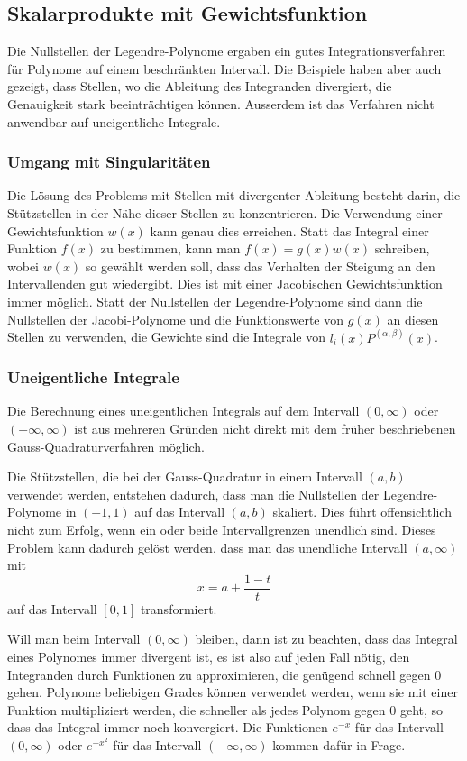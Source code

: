 \subsection{Skalarprodukte mit Gewichtsfunktion}
Die Nullstellen der Legendre-Polynome ergaben ein gutes
Integrationsverfahren für Polynome auf einem beschränkten
Intervall.
Die Beispiele haben aber auch gezeigt, dass Stellen, wo die
Ableitung des Integranden divergiert, die Genauigkeit stark
beeinträchtigen können.
Ausserdem ist das Verfahren nicht anwendbar auf uneigentliche
Integrale.

\subsubsection{Umgang mit Singularitäten}
Die Lösung des Problems mit Stellen mit divergenter Ableitung
besteht darin, die Stützstellen in der Nähe dieser Stellen
zu konzentrieren.
Die Verwendung einer Gewichtsfunktion $w(x)$ kann genau dies
erreichen.
Statt das Integral einer Funktion $f(x)$ zu bestimmen, 
kann man $f(x)=g(x)w(x)$ schreiben, wobei $w(x)$ so
gewählt werden soll, dass das Verhalten der Steigung an
den Intervallenden gut wiedergibt.
Dies ist mit einer Jacobischen Gewichtsfunktion immer möglich.
Statt der Nullstellen der Legendre-Polynome sind dann die
Nullstellen der Jacobi-Polynome  und die Funktionswerte von $g(x)$
an diesen Stellen zu verwenden,  die Gewichte sind
die Integrale von $l_i(x) P^{(\alpha,\beta)}(x)$.

\subsubsection{Uneigentliche Integrale}
Die Berechnung eines uneigentlichen Integrals auf dem Intervall
$(0,\infty)$ oder $(-\infty,\infty)$ ist aus mehreren Gründen nicht
direkt mit dem früher beschriebenen Gauss-Quadraturverfahren
möglich.

Die Stützstellen, die bei der Gauss-Quadratur in einem Intervall
$(a,b)$ verwendet werden, entstehen dadurch, dass man die Nullstellen
der Legendre-Polynome in $(-1,1)$ auf das Intervall $(a,b)$
skaliert.
Dies führt offensichtlich nicht zum Erfolg, wenn ein oder beide
Intervallgrenzen unendlich sind.
Dieses Problem kann dadurch gelöst werden, dass man das unendliche
Intervall $(a,\infty)$ mit
\[
x =  a + \frac{1-t}{t}
\]
auf das Intervall $[0,1]$ transformiert.

Will man beim Intervall $(0,\infty)$ bleiben, dann ist zu beachten,
dass das Integral eines Polynomes immer divergent ist, es ist also
auf jeden Fall nötig, den Integranden durch Funktionen zu approximieren,
die genügend schnell gegen $0$ gehen.
Polynome beliebigen Grades können verwendet werden, wenn sie mit
einer Funktion multipliziert werden, die schneller als jedes Polynom
gegen $0$ geht, so dass das Integral immer noch konvergiert.
Die Funktionen $e^{-x}$ für das Intervall $(0,\infty)$ oder
$e^{-x^2}$ für das Intervall $(-\infty,\infty)$ kommen dafür in Frage.

